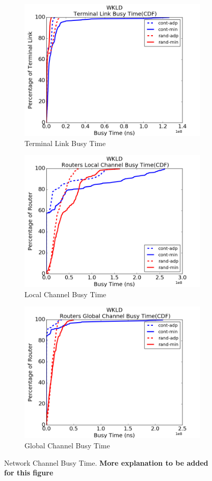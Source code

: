 \documentclass[conference,compsoc]{IEEEtran}
\begin{document}
\begin{figure}[t!]
    \centering
    \begin{subfigure}[t]{0.32\textwidth}
        \centering
        \includegraphics[height=1.8 in]{wkld/tl-stime}
        \caption{Terminal Link Busy Time}
        \label{fig:terminal-link-stime}
    \end{subfigure}%
    \hspace{1em}%
    \begin{subfigure}[t]{0.32\textwidth}
        \centering
        \includegraphics[height=1.8 in]{wkld/lc-stime}
        \caption{Local Channel Busy Time}
        \label{fig:local-channel-stime}
    \end{subfigure}%
    \begin{subfigure}[t]{0.32\textwidth}
        \centering
        \includegraphics[height=1.8 in]{wkld/gc-stime}
        \caption{Global Channel Busy Time}
        \label{fig:global-channel-stime}
    \end{subfigure}%
   \caption{Network Channel Busy Time. \textbf{More explanation to be added for this figure}}
   \label{fig:wkld-network-stime}
\end{figure}
\end{document}
